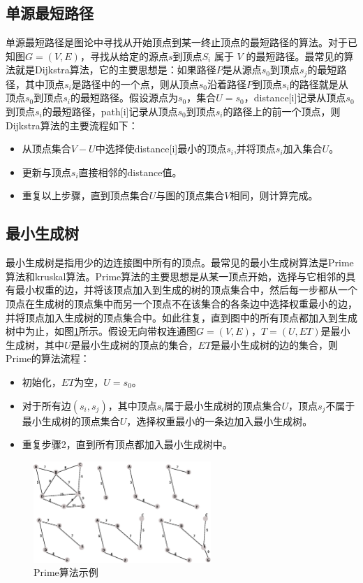 \subsection{单源最短路径}
单源最短路径是图论中寻找从开始顶点到某一终止顶点的最短路径的算法。对于已知图$G=(V,E)$，寻找从给定的源点$s$到顶点$S_i$ 属于 $V$ 的最短路径。最常见的算法就是Dijkstra算法，它的主要思想是：如果路径$P$是从源点$s_0$到顶点$s_j$的最短路径，其中顶点$s_i$是路径中的一个点，则从顶点$s_0$沿着路径$P$到顶点$s_i$的路径就是从顶点$s_0$到顶点$s_i$的最短路径。假设源点为$s_0$，集合$U={s_0}$，distance[i]记录从顶点$s_0$到顶点$s_i$的最短路径，path[i]记录从顶点$s_0$到顶点$s_i$的路径上的前一个顶点，则Dijkstra算法的主要流程如下：

\begin{itemize}
\item 从顶点集合$V-U$中选择使distance[i]最小的顶点$s_i$,并将顶点$s_i$加入集合$U$。
\item 更新与顶点$s_i$直接相邻的distance值。
\item 重复以上步骤，直到顶点集合$U$与图的顶点集合$V$相同，则计算完成。
\end{itemize}


\subsection{最小生成树}
最小生成树是指用少的边连接图中所有的顶点。最常见的最小生成树算法是Prime算法和kruskal算法。Prime算法的主要思想是从某一顶点开始，选择与它相邻的具有最小权重的边，并将该顶点加入到生成的树的顶点集合中，然后每一步都从一个顶点在生成树的顶点集中而另一个顶点不在该集合的各条边中选择权重最小的边，并将顶点加入生成树的顶点集合中。如此往复，直到图中的所有顶点都加入到生成树中为止，如图\ref{fig:prime}所示。假设无向带权连通图$G=(V,E)$，$T=(U,ET)$是最小生成树，其中$U$是最小生成树的顶点的集合，$ET$是最小生成树的边的集合，则Prime的算法流程：

\begin{itemize}
\item 初始化，$ET$为空，$U={s_0}$。
\item 对于所有边$(s_i,s_j)$，其中顶点$s_i$属于最小生成树的顶点集合$U$，顶点$s_j$不属于最小生成树的顶点集合$U$，选择权重最小的一条边加入最小生成树。
\item 重复步骤2，直到所有顶点都加入最小生成树中。
\end{itemize}


\begin{figure}[htbp]
\centering
\includegraphics[width=0.6\textwidth]{myfigures/prime}
\caption{Prime算法示例}\label{fig:prime}
\vspace{\baselineskip}
\end{figure}

